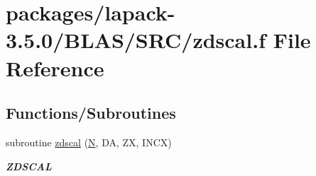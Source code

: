 \hypertarget{lapack-3_85_80_2BLAS_2SRC_2zdscal_8f}{}\section{packages/lapack-\/3.5.0/\+B\+L\+A\+S/\+S\+R\+C/zdscal.f File Reference}
\label{lapack-3_85_80_2BLAS_2SRC_2zdscal_8f}
\subsection*{Functions/\+Subroutines}
\begin{DoxyCompactItemize}
\item 
subroutine \hyperlink{group__complex16__blas__level1_ga26b12037cfbbebe5bde3faadc557e30b}{zdscal} (\hyperlink{polmisc_8c_a0240ac851181b84ac374872dc5434ee4}{N}, D\+A, Z\+X, I\+N\+C\+X)
\begin{DoxyCompactList}\small\item\em {\bfseries Z\+D\+S\+C\+A\+L} \end{DoxyCompactList}\end{DoxyCompactItemize}
